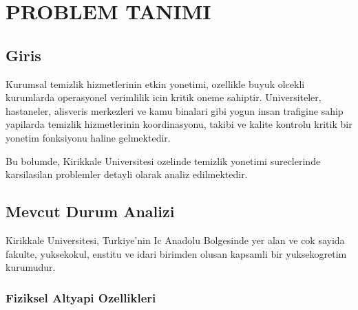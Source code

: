 
\chapter{PROBLEM TANIMI}
\label{chap:problem-tanimi}

\section{Giris}
\label{sec:problem-giris}

Kurumsal temizlik hizmetlerinin etkin yonetimi, ozellikle buyuk olcekli 
kurumlarda operasyonel verimlilik icin kritik oneme sahiptir. Universiteler, 
hastaneler, alisveris merkezleri ve kamu binalari gibi yogun insan 
trafigine sahip yapilarda temizlik hizmetlerinin koordinasyonu, takibi 
ve kalite kontrolu kritik bir yonetim fonksiyonu haline gelmektedir.

Bu bolumde, Kirikkale Universitesi ozelinde temizlik yonetimi 
sureclerinde karsilasilan problemler detayli olarak analiz 
edilmektedir.

\section{Mevcut Durum Analizi}
\label{sec:mevcut-durum}

Kirikkale Universitesi, Turkiye'nin Ic Anadolu Bolgesinde yer alan 
ve cok sayida fakulte, yuksekokul, enstitu ve idari birimden olusan 
kapsamli bir yuksekogretim kurumudur.

\subsection{Fiziksel Altyapi Ozellikleri}
\label{subsec:fiziksel-altyapi}

